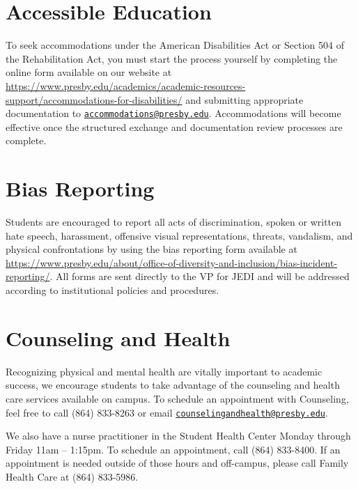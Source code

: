 \documentclass[
]{book}
\begin{document}
\hypertarget{accessible-education}{%
\section*{Accessible Education}\label{accessible-education}}

To seek accommodations under the American Disabilities Act or Section 504 of the Rehabilitation Act, you must start the process yourself by completing the online form available on our website at \url{https://www.presby.edu/academics/academic-resources-support/accommodations-for-disabilities/} and submitting appropriate documentation to \href{mailto:accommodations@presby.edu}{\nolinkurl{accommodations@presby.edu}}. Accommodations will become effective once the structured exchange and documentation review processes are complete.

\hypertarget{bias-reporting}{%
\section*{Bias Reporting}\label{bias-reporting}}

Students are encouraged to report all acts of discrimination, spoken or written hate speech, harassment, offensive visual representations, threats, vandalism, and physical confrontations by using the bias reporting form available at \url{https://www.presby.edu/about/office-of-diversity-and-inclusion/bias-incident-reporting/}. All forms are sent directly to the VP for JEDI and will be addressed according to institutional policies and procedures.

\hypertarget{counseling-and-health}{%
\section*{Counseling and Health}\label{counseling-and-health}}

Recognizing physical and mental health are vitally important to academic success, we encourage students to take advantage of the counseling and health care services available on campus. To schedule an appointment with Counseling, feel free to call (864) 833-8263 or email \href{mailto:counselingandhealth@presby.edu}{\nolinkurl{counselingandhealth@presby.edu}}.

We also have a nurse practitioner in the Student Health Center Monday through Friday 11am -- 1:15pm. To schedule an appointment, call (864) 833-8400. If an appointment is needed outside of those hours and off-campus, please call Family Health Care at (864) 833-5986.
\end{document}

